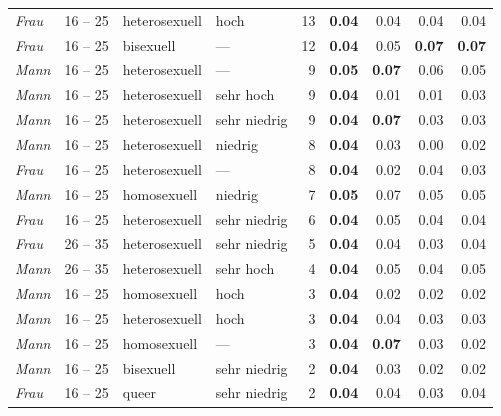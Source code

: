 \begin{ThreePartTable}
\begin{longtable}{llllr rrrr}
        \emph{Frau} & 16 -- 25 & heterosexuell & hoch         & 13 & \textbf{0.04} & 0.04          & 0.04          & 0.04          \\
        \emph{Frau} & 16 -- 25 & bisexuell     & ---          & 12 & \textbf{0.04} & 0.05          & \textbf{0.07} & \textbf{0.07} \\
        \emph{Mann} & 16 -- 25 & heterosexuell & ---          &  9 & \textbf{0.05} & \textbf{0.07} & 0.06          & 0.05          \\
        \emph{Mann} & 16 -- 25 & heterosexuell & sehr hoch    &  9 & \textbf{0.04} & 0.01          & 0.01          & 0.03          \\
        \emph{Mann} & 16 -- 25 & heterosexuell & sehr niedrig &  9 & \textbf{0.04} & \textbf{0.07} & 0.03          & 0.03          \\
        \emph{Mann} & 16 -- 25 & heterosexuell & niedrig      &  8 & \textbf{0.04} & 0.03          & 0.00          & 0.02          \\
        \emph{Frau} & 16 -- 25 & heterosexuell & ---          &  8 & \textbf{0.04} & 0.02          & 0.04          & 0.03          \\
        \emph{Mann} & 16 -- 25 & homosexuell   & niedrig      &  7 & \textbf{0.05} & 0.07          & 0.05          & 0.05          \\
        \emph{Frau} & 16 -- 25 & heterosexuell & sehr niedrig &  6 & \textbf{0.04} & 0.05          & 0.04          & 0.04          \\
        \emph{Frau} & 26 -- 35 & heterosexuell & sehr niedrig &  5 & \textbf{0.04} & 0.04          & 0.03          & 0.04          \\
        \emph{Mann} & 26 -- 35 & heterosexuell & sehr hoch    &  4 & \textbf{0.04} & 0.05          & 0.04          & 0.05          \\
        \emph{Mann} & 16 -- 25 & homosexuell   & hoch         &  3 & \textbf{0.04} & 0.02          & 0.02          & 0.02          \\
        \emph{Mann} & 16 -- 25 & heterosexuell & hoch         &  3 & \textbf{0.04} & 0.04          & 0.03          & 0.03          \\
        \emph{Mann} & 16 -- 25 & homosexuell   & ---          &  3 & \textbf{0.04} & \textbf{0.07} & 0.03          & 0.02          \\
        \emph{Mann} & 16 -- 25 & bisexuell     & sehr niedrig &  2 & \textbf{0.04} & 0.03          & 0.02          & 0.02          \\
        \emph{Frau} & 16 -- 25 & queer         & sehr niedrig &  2 & \textbf{0.04} & 0.04          & 0.03          & 0.04          \\
    
    \end{longtable}
\end{ThreePartTable}
\normalsize



